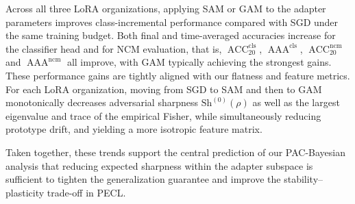\documentclass{article}
\theoremstyle{plain}
\theoremstyle{definition}
\theoremstyle{remark}
\begin{document}
Across all three LoRA organizations, applying SAM or GAM to the adapter parameters improves class-incremental performance compared with SGD under the same training budget. Both final and time-averaged accuracies increase for the classifier head and for NCM evaluation, that is, $\operatorname{ACC}_{20}^{\mathrm{cls}}$, $\operatorname{AAA}^{\mathrm{cls}}$, $\operatorname{ACC}_{20}^{\mathrm{ncm}}$ and $\operatorname{AAA}^{\mathrm{ncm}}$ all improve, with GAM typically achieving the strongest gains. 
These performance gains are tightly aligned with our flatness and feature metrics. For each LoRA organization, moving from SGD to SAM and then to GAM monotonically decreases adversarial sharpness $\mathrm{Sh}^{(0)}(\rho)$ as well as the largest eigenvalue and trace of the empirical Fisher, while simultaneously reducing prototype drift, and yielding a more isotropic feature matrix. 

Taken together, these trends support the central prediction of our PAC-Bayesian analysis that reducing expected sharpness within the adapter subspace is sufficient to tighten the generalization guarantee and improve the stability–plasticity trade-off in PECL.

\end{document}
